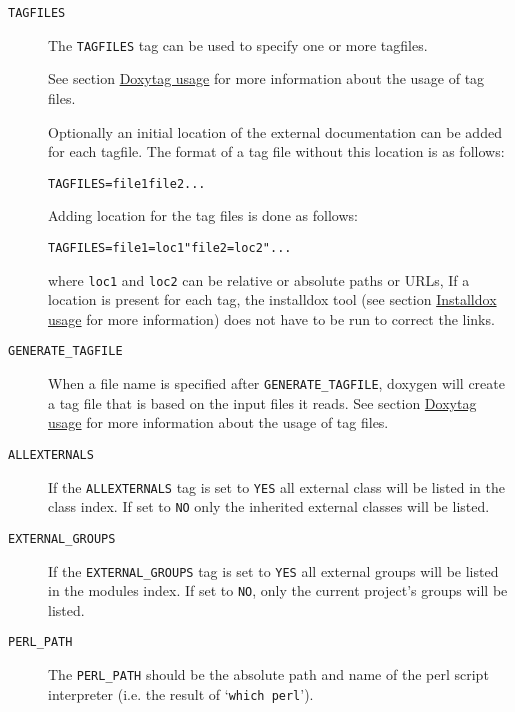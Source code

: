  \begin{description}
\item[{\tt TAGFILES} ] The {\tt TAGFILES} tag can be used to specify one or more tagfiles.

See section \hyperlink{doxytag_usage}{Doxytag usage} for more information about the usage of tag files.

Optionally an initial location of the external documentation can be added for each tagfile. The format of a tag file without this location is as follows: \small\begin{alltt}
TAGFILES = file1 file2 ... \end{alltt}
\normalsize 
 Adding location for the tag files is done as follows: \small\begin{alltt}
TAGFILES = file1=loc1 "file2 = loc2" ... \end{alltt}
\normalsize 
 where {\tt loc1} and {\tt loc2} can be relative or absolute paths or URLs, If a location is present for each tag, the installdox tool (see section \hyperlink{installdox_usage}{Installdox usage} for more information) does not have to be run to correct the links.

\label{config_cfg_generate_tagfile}
\hypertarget{config_cfg_generate_tagfile}{}
 \item[{\tt GENERATE\_\-TAGFILE} ] When a file name is specified after {\tt GENERATE\_\-TAGFILE}, doxygen will create a tag file that is based on the input files it reads. See section \hyperlink{doxytag_usage}{Doxytag usage} for more information about the usage of tag files.

\label{config_cfg_allexternals}
\hypertarget{config_cfg_allexternals}{}
 \item[{\tt ALLEXTERNALS} ] If the {\tt ALLEXTERNALS} tag is set to {\tt YES} all external class will be listed in the class index. If set to {\tt NO} only the inherited external classes will be listed.

\label{config_cfg_external_groups}
\hypertarget{config_cfg_external_groups}{}
 \item[{\tt EXTERNAL\_\-GROUPS} ] If the {\tt EXTERNAL\_\-GROUPS} tag is set to {\tt YES} all external groups will be listed in the modules index. If set to {\tt NO}, only the current project's groups will be listed.

\label{config_cfg_perl_path}
\hypertarget{config_cfg_perl_path}{}
 \item[{\tt PERL\_\-PATH} ] The {\tt PERL\_\-PATH} should be the absolute path and name of the perl script interpreter (i.e. the result of `{\tt which perl}').

\end{description}
